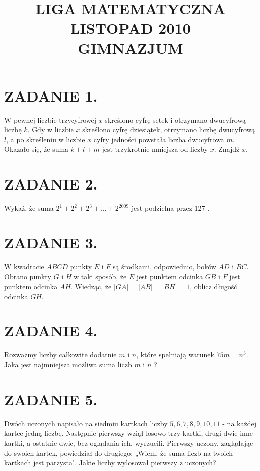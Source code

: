 \documentclass[10pt]{article}
\title{LIGA MATEMATYCZNA \\
 LISTOPAD 2010 \\
 GIMNAZJUM }
\author{}
\date{}
\begin{document}
\maketitle
\section*{ZADANIE 1.}
W pewnej liczbie trzycyfrowej \(x\) skreślono cyfrę setek i otrzymano dwucyfrową liczbę \(k\). Gdy w liczbie \(x\) skreślono cyfrę dziesiątek, otrzymano liczbę dwucyfrową \(l\), a po skreśleniu w liczbie \(x\) cyfry jedności powstała liczba dwucyfrowa \(m\). Okazało się, że suma \(k+l+m\) jest trzykrotnie mniejsza od liczby \(x\). Znajdź \(x\).

\section*{ZADANIE 2.}
Wykaż, że suma \(2^{1}+2^{2}+2^{3}+\ldots+2^{2009}\) jest podzielna przez 127 .

\section*{ZADANIE 3.}
W kwadracie \(A B C D\) punkty \(E\) i \(F\) są środkami, odpowiednio, boków \(A D\) i \(B C\). Obrano punkty \(G\) i \(H\) w taki sposób, że \(E\) jest punktem odcinka \(G B\) i \(F\) jest punktem odcinka \(A H\). Wiedząc, że \(|G A|=|A B|=|B H|=1\), oblicz długość odcinka \(G H\).

\section*{ZADANIE 4.}
Rozważmy liczby całkowite dodatnie \(m\) i \(n\), które spełniają warunek \(75 m=n^{3}\). Jaka jest najmniejsza możliwa suma liczb \(m\) i \(n\) ?

\section*{ZADANIE 5.}
Dwóch uczonych napisało na siedmiu kartkach liczby \(5,6,7,8,9,10,11\) - na każdej kartce jedną liczbę. Następnie pierwszy wziął losowo trzy kartki, drugi dwie inne kartki, a ostatnie dwie, bez oglądania ich, wyrzucili. Pierwszy uczony, zaglądając do swoich kartek, powiedział do drugiego: „Wiem, że suma liczb na twoich kartkach jest parzysta". Jakie liczby wylosował pierwszy z uczonych?
\end{document}
